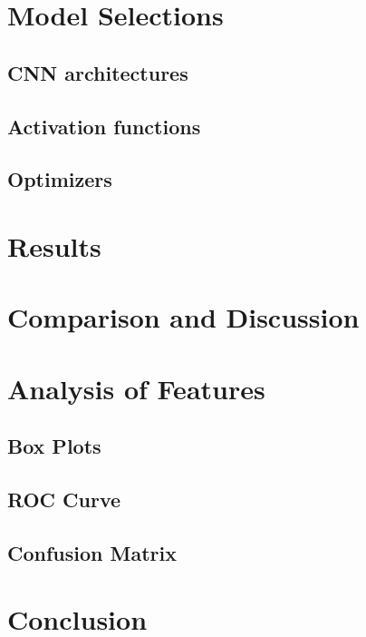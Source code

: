 \documentclass[12pt, oneside]{article}   	%
\begin{document}
\newpage
\section{Model Selections}
\subsection{CNN architectures}
\subsection{Activation functions}
\subsection{Optimizers}



\newpage
\section{Results}


\newpage
\section{Comparison and Discussion}


\newpage
\section{Analysis of Features}
\subsection{Box Plots}
\subsection{ROC Curve}
\subsection{Confusion Matrix}


\section{Conclusion}


\cleardoublepage

\cleardoublepage
\end{document}
